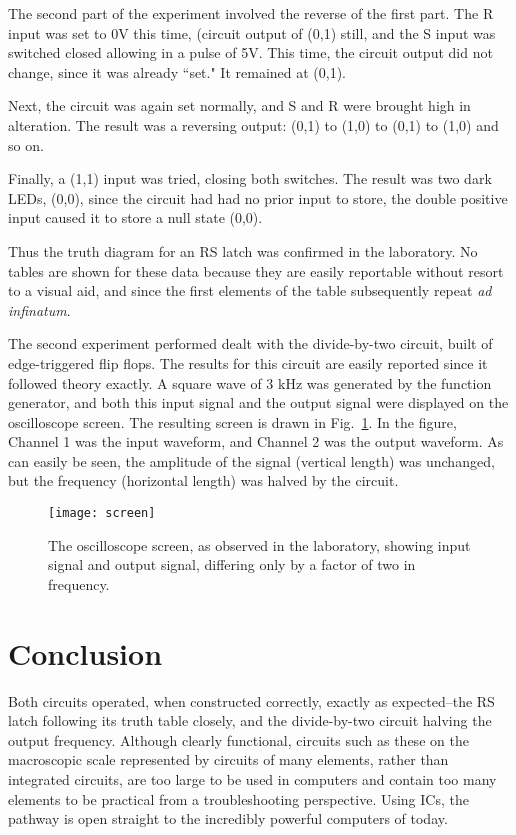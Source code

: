 \documentclass[aps,pre,twocolumn,nofootinbib]{revtex4}
\begin{document}
The second part of the experiment involved the reverse of the first part.  The R input was set to 0V this time, (circuit output of (0,1) still, and the S input was switched closed allowing in a pulse of 5V.  This time, the circuit output did not change, since it was already ``set."  It remained at (0,1).  

Next, the circuit was again set normally, and S and R were brought high in alteration.  The result was a reversing output:  (0,1) to (1,0) to (0,1) to (1,0) and so on.  

Finally, a (1,1) input was tried, closing both switches.  The result was two dark LEDs, (0,0), since the circuit had had no prior input to store, the double positive input caused it to store a null state (0,0).  

Thus the truth diagram for an RS latch was confirmed in the laboratory.  No tables are shown for these data because they are easily reportable without resort to a visual aid, and since the first elements of the table subsequently repeat \textit{ad infinatum}.  

The second experiment performed dealt with the divide-by-two circuit, built of edge-triggered flip flops.  The results for this circuit are easily reported since it followed theory exactly.  A square wave of 3 kHz was generated by the function generator, and both this input signal and the output signal were displayed on the oscilloscope screen.  The resulting screen is drawn in Fig.~\ref{screen}.  In the figure, Channel 1 was the input waveform, and Channel 2 was the output waveform.  As can easily be seen, the amplitude of the signal (vertical length) was unchanged, but the frequency (horizontal length) was halved by the circuit. 

\begin{figure}[h]
\centering
\texttt{[image: screen]} 
\caption{The oscilloscope screen, as observed in the laboratory, showing input signal and output signal, differing only by a factor of two in frequency.}
\label{screen}
\end{figure}

\section{Conclusion}

Both circuits operated, when constructed correctly, exactly as expected--the RS latch following its truth table closely, and the divide-by-two circuit halving the output frequency.  Although clearly functional, circuits such as these on the macroscopic scale represented by circuits of many elements, rather than integrated circuits, are too large to be used in computers and contain too many elements to be practical from a troubleshooting perspective.    Using ICs, the pathway is open straight to the incredibly powerful computers of today.  
\end{document}
